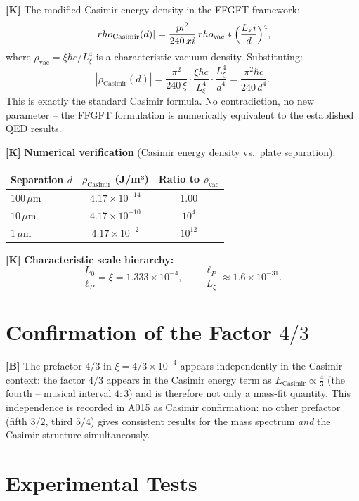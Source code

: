 \textbf{[K]} The modified Casimir energy density in the FFGFT framework:
\[
  |\rho_\text{Casimir}(d)|
  = \frac{\pi^2}{240\,\xi}\,\rho_\text{vac}\cdot\Bigl(\frac{L_\xi}{d}\Bigr)^4,
\]
where $\rho_\text{vac}=\xi\hbar c/L_\xi^4$ is a characteristic vacuum density.
Substituting:
\[
  |\rho_\text{Casimir}(d)|
  = \frac{\pi^2}{240\,\xi}\cdot\frac{\xi\hbar c}{L_\xi^4}\cdot\frac{L_\xi^4}{d^4}
  = \frac{\pi^2\hbar c}{240\,d^4}.
\]
This is exactly the standard Casimir formula. No contradiction, no new parameter --
the FFGFT formulation is numerically equivalent to the established QED results.

\textbf{[K]} \textbf{Numerical verification} (Casimir energy density vs.\ plate separation):

\begin{center}
\renewcommand{\arraystretch}{1.3}
{\small
\begin{tabular}{lcc}
\toprule
Separation $d$ & $\rho_\text{Casimir}$ (J/m³) & Ratio to $\rho_\text{vac}$ \\
\midrule
$100\,\mu$m & $4{.}17\times10^{-14}$ & 1{.}00 \\
$10\,\mu$m  & $4{.}17\times10^{-10}$ & $10^4$ \\
$1\,\mu$m   & $4{.}17\times10^{-2}$  & $10^{12}$ \\
\bottomrule
\end{tabular}
}
\renewcommand{\arraystretch}{1.0}
\end{center}

\textbf{[K]} \textbf{Characteristic scale hierarchy:}
\[
  \frac{L_0}{\ell_P} = \xi = 1{.}333\times10^{-4},
  \qquad
  \frac{\ell_P}{L_\xi} \approx 1{.}6\times10^{-31}.
\]

\section{Confirmation of the Factor $4/3$}

\textbf{[B]} The prefactor $4/3$ in $\xi=4/3\times10^{-4}$ appears independently
in the Casimir context: the factor $4/3$ appears in the Casimir energy term as
$E_\text{Casimir}\propto\tfrac43$ (the fourth -- musical interval $4{:}3$) and is
therefore not only a mass-fit quantity. This independence is recorded in A015 as
Casimir confirmation: no other prefactor (fifth $3/2$, third $5/4$) gives
consistent results for the mass spectrum \emph{and} the Casimir structure
simultaneously.

\section{Experimental Tests}

